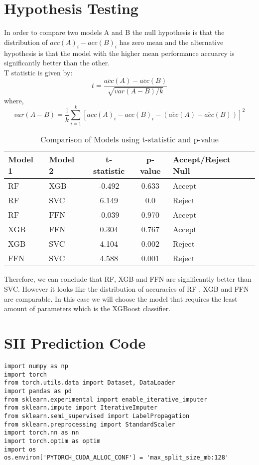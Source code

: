 \begin{appendices}
    \pagebreak
    \section{Hypothesis Testing}
    In order to compare two models A and B the null hypothesis is that the distribution of $acc(A)_i - acc(B)_i$ has zero mean and the alternative hypothesis is that the model with the higher mean performance accuarcy is significantly better than the other.\\
    T statistic is given by:
        \[
        t = \frac{\overline{acc}(A) - \overline{acc}(B)}{\sqrt{var(A - B)/k}}
        \]
        where,
        \[
        var(A - B) = \frac{1}{k}\sum_{i=1}^k [acc(A)_i - acc(B)_i - (\overline{acc}(A) - \overline{acc}(B))]^2
        \]

        \begin{table}[h!]
            \centering
            \caption{Comparison of Models using t-statistic and p-value}
            \begin{tabular}{|l|l|c|c|l|}
                \hline
                \textbf{Model 1} & \textbf{Model 2} & \textbf{t-statistic} & \textbf{p-value} & \textbf{Accept/Reject Null} \\
                \hline
                RF & XGB & -0.492 & 0.633 & Accept \\
                \hline
                RF & SVC & 6.149 & 0.0 & Reject \\
                \hline
                RF & FFN & -0.039 & 0.970 & Accept \\
                \hline
                XGB & FFN & 0.304 & 0.767 & Accept \\
                \hline
                XGB & SVC & 4.104 & 0.002 & Reject \\
                \hline
                FFN & SVC & 4.588 & 0.001 & Reject \\
                \hline
            \end{tabular}
        \end{table}
    Therefore, we can conclude that RF, XGB and FFN are significantly better than SVC. 
    However it looks like the distribution of accuracies of RF , XGB and FFN are comparable. 
    In this case we will choose the model that requires the least amount of parameters which is the XGBoost classifier.

    \pagebreak
    \section{SII Prediction Code}
    \begin{mdframed}
    \begin{lstlisting}[breaklines=true]
        import numpy as np
import torch
from torch.utils.data import Dataset, DataLoader
import pandas as pd
from sklearn.experimental import enable_iterative_imputer 
from sklearn.impute import IterativeImputer
from sklearn.semi_supervised import LabelPropagation
from sklearn.preprocessing import StandardScaler
import torch.nn as nn
import torch.optim as optim
import os
os.environ['PYTORCH_CUDA_ALLOC_CONF'] = 'max_split_size_mb:128'


\end{lstlisting}
\end{mdframed}
\end{appendices}
